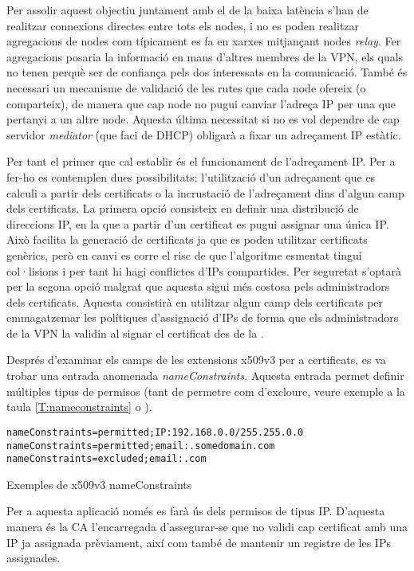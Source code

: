 Per assolir aquest objectiu juntament amb el de la baixa latència s'han de realitzar connexions directes entre tots els nodes, i no es poden realitzar agregacions de nodes com típicament es fa en xarxes  mitjançant nodes \emph{relay}. Fer agregacions posaria la informació en mans d'altres membres de la VPN, els quals no tenen perquè ser de confiança pels dos interessats en la comunicació. També és necessari un mecanisme de validació de les rutes que cada node ofereix (o comparteix), de manera que cap node no pugui canviar l'adreça IP per una que pertanyi a un altre node. Aquesta última necessitat si no es vol dependre de cap servidor \emph{mediator} (que faci de DHCP) obligarà a fixar un adreçament IP estàtic.

Per tant el primer que cal establir és el funcionament de l'adreçament IP. Per a fer-ho es contemplen dues possibilitats: l'utilització d'un adreçament que es calculi a partir dels certificats o la incrustació de l'adreçament dins d'algun camp dels certificats.
La primera opció consisteix en definir una distribució de direccions IP, en la que a partir d'un certificat es pugui assignar una única IP. Això facilita la generació de certificats ja que es poden utilitzar certificats genèrics, però en canvi es corre el risc de que l'algoritme esmentat tingui col·lisions i per tant hi hagi conflictes d'IPs compartides. Per seguretat s'optarà per la segona opció malgrat que aquesta sigui més costosa pels administradors dels certificats. Aquesta consistirà en utilitzar algun camp dels certificats per emmagatzemar les polítiques d'assignació d'IPs de forma que els administradors de la VPN la validin al signar el certificat des de la .

Després d'examinar els camps de les extensions x509v3 per a certificats, es va trobar una entrada anomenada \emph{nameConstraints}. Aquesta entrada permet definir múltiples tipus de permisos (tant de permetre com d'excloure, veure exemple a la taula \ref{T:nameconstraints} o \cite{nameconstraints}).
\begin{table}[htb]
\begin{center}
\begin{minipage}[htb]{0.6\linewidth}
\footnotesize
\begin{verbatim}
nameConstraints=permitted;IP:192.168.0.0/255.255.0.0
nameConstraints=permitted;email:.somedomain.com
nameConstraints=excluded;email:.com
\end{verbatim}
\end{minipage}
\caption{Exemples de x509v3 nameConstraints}
\label{T:nameconstraints}
\end{center}
\end{table}
Per a aquesta aplicació només es farà ús dels permisos de tipus IP. D'aquesta manera és la CA l'encarregada d'assegurar-se que no validi cap certificat amb una IP ja assignada prèviament, així com també de mantenir un registre de les IPs assignades.

